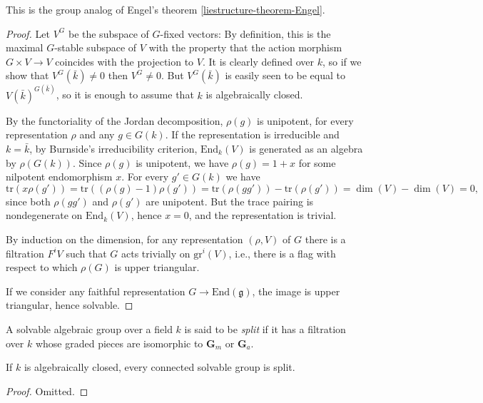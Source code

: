 This is the group analog of Engel's theorem \ref{liestructure-theorem-Engel}.

\begin{proof}
Let $V^G$ be the subspace of $G$-fixed vectors: By definition, this is the maximal $G$-stable subspace of $V$ with the property that the action morphism $G\times V\to V$ coincides with the projection to $V$. It is clearly defined over $k$, so if we show that $V^G(\bar k) \ne 0$ then $V^G\ne 0$. But $V^G(\bar k)$ is easily seen to be equal to $V(\bar k)^{G(\bar k)}$, so it is enough to assume that $k$ is algebraically closed. 

By the functoriality of the Jordan decomposition, $\rho(g)$ is unipotent, for every representation $\rho$ and any $g\in G(k)$. If the representation is irreducible and $k = \bar k$, by Burnside's irreducibility criterion, $\text{End}_k(V)$ is generated as an algebra by $\rho(G(k))$. Since $\rho(g)$ is unipotent, we have $\rho(g) = 1+x$ for some nilpotent endomorphism $x$. For every $g'\in G(k)$ we have 
$$ \text{tr}(x\rho(g')) =\text{tr}((\rho(g)-1)\rho(g'))= \text{tr}(\rho(gg'))-\text{tr}(\rho(g')) = \dim(V)-\dim(V)=0,$$
since both $\rho(gg')$ and $\rho(g')$ are unipotent. But the trace pairing is nondegenerate on $\text{End}_k(V)$, hence $x=0$, and the representation is trivial.

By induction on the dimension, for any representation $(\rho,V)$ of $G$ there is a filtration $F^i V$ such that $G$ acts trivially on $\text{gr}^i(V)$, i.e., there is a flag with respect to which $\rho(G)$ is upper triangular.

If we consider any faithful representation $G\to \text{End}(\mathfrak g)$, the image is upper triangular, hence solvable.
\end{proof}

\begin{definition}
\label{definition-split-solvable}
 A solvable algebraic group over a field $k$ is said to be {\it split} if it has a filtration over $k$ whose graded pieces are isomorphic to $\mathbf G_m$ or $\mathbf G_a$.
\end{definition}

\begin{lemma}
\label{lemma-connected-solvable-split}
 If $k$ is algebraically closed, every connected solvable group is split.
\end{lemma}

\begin{proof}
 Omitted.
\end{proof}

